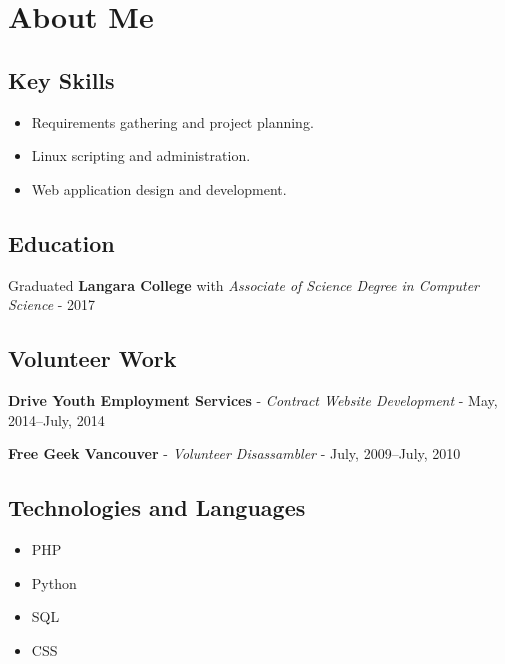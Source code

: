 \documentclass[oneside]{scrartcl}
\begin{document}
\section{About Me}

\begin{multicols}{2}

\subsection{Key Skills}

\begin{itemize}[nosep]
\item Requirements gathering and project planning.
\item Linux scripting and administration.
\item Web application design and development.
\end{itemize}

\subsection{Education}

Graduated {\large \textbf{Langara College}} with \textit{Associate of
Science Degree in Computer Science} - 2017

\subsection{Volunteer Work}

\textbf{Drive Youth Employment Services} - \textit{Contract Website Development} - May, 2014--July, 2014

\textbf{Free Geek Vancouver} - \textit{Volunteer Disassambler} - July, 2009--July, 2010

\subsection{Technologies and Languages}

\begin{itemize}[nosep]
\item PHP
\item Python
\item SQL
\item CSS
\end{itemize}


\end{multicols}
\end{document}
